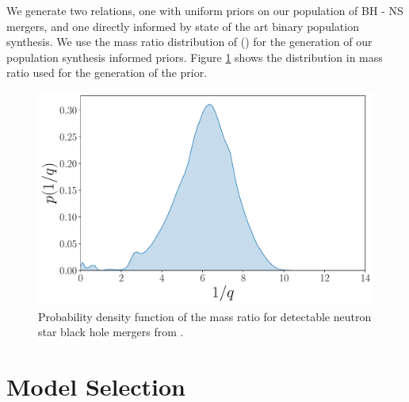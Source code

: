 \documentclass[twocolumn]{aastex631}
\begin{document}
We generate two relations, one with uniform priors on our population of BH - NS mergers, and one directly informed by state of the art binary population synthesis. We use the mass ratio distribution of \cite{2021Broekgaarden+}  () for the generation of our population synthesis informed priors. Figure \ref{fig:mass ratio distrbution} shows the distribution in mass ratio used for the generation of the prior. 
\begin{figure}
    \centering
    \includegraphics[width=\linewidth]{NSBH_mass_ratio_density.pdf}
    \caption{Probability density function of the mass ratio for detectable neutron star black hole mergers from \citep{2021Broekgaarden+}.}
    \label{fig:mass ratio distrbution}
\end{figure}
\section{Model Selection}\label{sec:Model Selection}

{}

\end{document}
